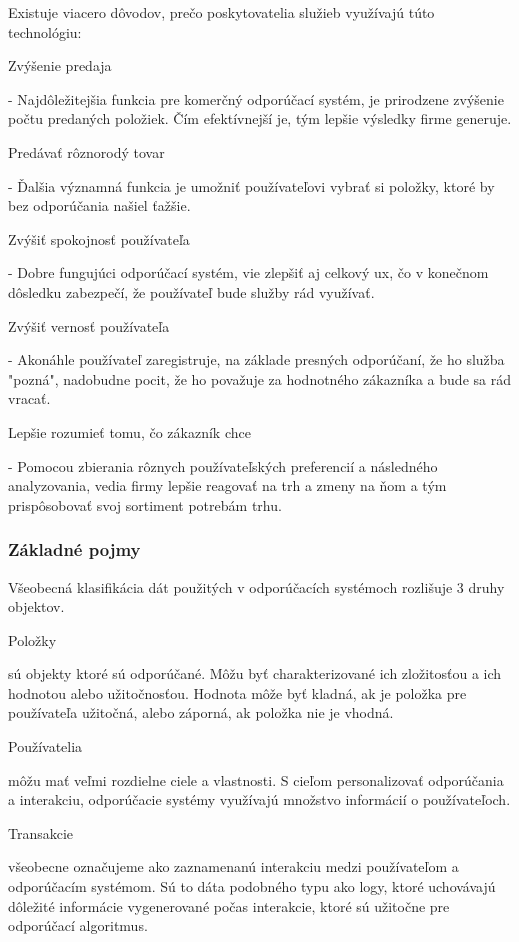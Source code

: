 Existuje viacero dôvodov, prečo poskytovatelia služieb využívajú túto technológiu: 
 \begin{itemize}[leftmargin=*]
{\bf \item Zvýšenie predaja} - Najdôležitejšia funkcia pre komerčný odporúčací systém, je prirodzene zvýšenie počtu predaných položiek. Čím efektívnejší je, tým lepšie výsledky firme generuje. 

{\bf \item Predávať rôznorodý tovar} - Ďalšia významná funkcia je umožniť používateľovi vybrať si položky, ktoré by bez odporúčania našiel ťažšie. 
 
{\bf \item Zvýšiť spokojnosť používateľa} - Dobre fungujúci odporúčací systém, vie zlepšiť aj celkový \acrshort{ux}, čo v konečnom dôsledku zabezpečí, že používateľ bude služby rád využívať. 

{\bf \item Zvýšiť vernosť používateľa} - Akonáhle používateľ zaregistruje, na základe presných odporúčaní, že ho služba "pozná", nadobudne pocit, že ho považuje za hodnotného zákazníka a bude sa rád vracať.
	
{\bf \item Lepšie rozumieť tomu, čo zákazník chce} - Pomocou zbierania rôznych používateľských preferencií a následného analyzovania, vedia firmy lepšie reagovať na trh a zmeny na ňom a tým prispôsobovať svoj sortiment potrebám trhu. \cite{rs1} \newline

\end{itemize} 


\subsubsection{Základné pojmy}
Všeobecná klasifikácia dát použitých v odporúčacích systémoch rozlišuje 3 druhy objektov.
 \begin{itemize}[leftmargin=*]
{\bf \item Položky} sú objekty ktoré sú odporúčané. Môžu byť charakterizované ich zložitosťou a ich hodnotou alebo užitočnosťou. Hodnota môže byť kladná, ak je položka pre používateľa užitočná, alebo záporná, ak položka nie je vhodná. 
{\bf \item Používatelia} môžu mať veľmi rozdielne ciele a vlastnosti. S cieľom personalizovať odporúčania a interakciu, odporúčacie systémy využívajú množstvo informácií o používateľoch.
{\bf \item Transakcie} všeobecne označujeme ako zaznamenanú interakciu medzi používateľom a odporúčacím systémom. Sú to dáta podobného typu ako logy, ktoré uchovávajú dôležité informácie vygenerované počas interakcie, ktoré sú užitočne pre odporúčací algoritmus. \cite{rs1}
\end{itemize} 


